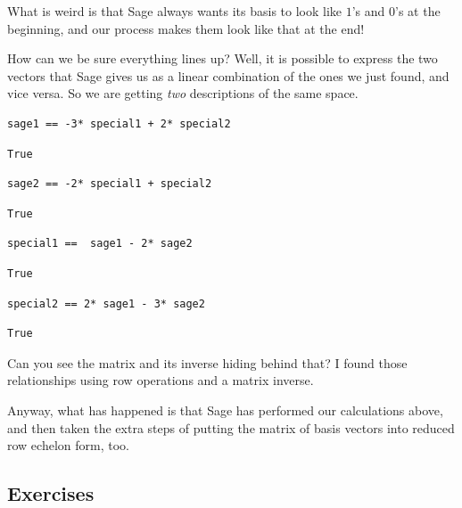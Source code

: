 \documentclass[10pt,]{book}
\theoremstyle{plain}
\numberwithin{equation}{section}
\begin{document}
      What is weird is that Sage always wants its basis to look
      like \(1\)'s and \(0\)'s at the beginning, and our process makes
      them look like that at the end!
\par

      How can we be sure everything lines up?  Well, it is possible to
      express the two vectors that Sage gives us as a linear combination
      of the ones we just found, and vice versa. So we are getting \emph{two}
      descriptions of the same space.
\begin{lstlisting}[style=sageinput]
sage1 == -3* special1 + 2* special2
\end{lstlisting}
\begin{lstlisting}[style=sageoutput]
True
\end{lstlisting}
\begin{lstlisting}[style=sageinput]
sage2 == -2* special1 + special2
\end{lstlisting}
\begin{lstlisting}[style=sageoutput]
True
\end{lstlisting}
\begin{lstlisting}[style=sageinput]
special1 ==  sage1 - 2* sage2
\end{lstlisting}
\begin{lstlisting}[style=sageoutput]
True
\end{lstlisting}
\begin{lstlisting}[style=sageinput]
special2 == 2* sage1 - 3* sage2
\end{lstlisting}
\begin{lstlisting}[style=sageoutput]
True
\end{lstlisting}
\par

      Can you see the matrix and its inverse hiding behind that? I found those
      relationships using row operations and a matrix inverse.
\par

      Anyway, what has happened is that Sage has performed our calculations above,
      and then taken the extra steps of putting the matrix of basis vectors into
      reduced row echelon form, too.
\typeout{************************************************}
\typeout{************************************************}
\subsection[Exercises]{Exercises}\label{subsection-67}
\end{document}
